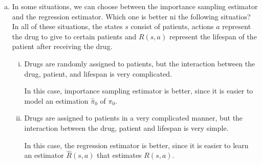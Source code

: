 \documentclass[12pt,letterpaper,boxed]{hmcpset}
\begin{document}
\begin{solution}
\begin{enumerate}[(a)]
\begin{enumerate}[i.]
        \begin{proof}
          As in the previous proof, we have
          \[
          \E_{a \sim \pi_1(s,a)} [\hat R(s,a)] = \sum_{a} \pi_1(s,a) \hat R(s,a).
          \]
          When $\hat R(s,a) = R(s,a)$, 
          \[
          \E_{\substack{s \sim p(s) \\ a \sim \pi_0(s,a)}} \qty[\E_{a \sim \pi_1(s,a)} \qty[\hat R(s,a)]] = \sum_s \sum_a \pi_1(s,a) R(s,a) p(s) = \E_{\substack{s \sim p(s) \\ a \sim \pi_1(s,a)}} [R(s,a)].
          \]
          The second term clearly vanishes when $\hat R(s,a) = R(s,a)$. Hence, the doubly robust estimator
          \[
          \E_{\substack{s \sim p(s) \\ a \sim \pi_0(s,a)}} \qty[ \E_{a \sim \pi_1(s,a)} \qty[\hat R(s,a)] + \frac{\pi_1(s,a)}{\hat \pi_0 (s,a)} (R(s,a) - \hat R(s,a)) ] = \E_{\substack{s \sim p(s) \\ a \sim \pi_1(s,a)}} [R(s,a)].
          \]
          when $\hat R(s,a) = R(s,a)$.
        \end{proof}
      \end{enumerate}
    
    \item In some situations, we can choose between the importance sampling estimator and the regression estimator. Which one is better ni the following situatios? In all of these situations, the states $s$ consist of patients, actions $a$ represent the drug to give to certain patients and $R(s,a)$ represent the lifespan of the patient after receiving the drug.
    \begin{enumerate}[i.]
      \item Drugs are randomly assigned to patients, but the interaction between the drug, patient, and lifespan is very complicated.
      
      In this case, importance sampling estimator is better, since it is easier to model an estimation $\hat \pi_0$ of $\pi_0$.

      \item Drugs are assigned to patients in a very complicated manner, but the interaction between the drug, patient and lifespan is very simple.
      
      In this case, the regression estimator is better, since it is easier to learn an estimator $\hat R(s,a)$ that estimates $R(s,a)$.
    \end{enumerate}
  \end{enumerate}
\end{solution}
\end{document}
